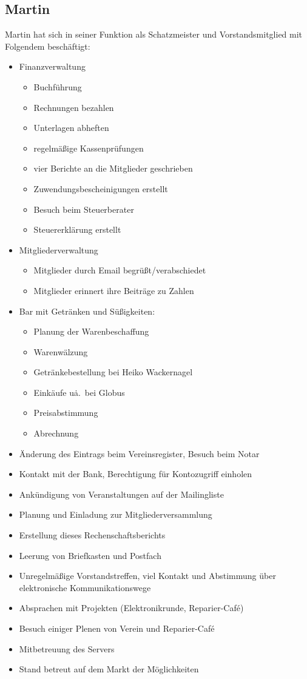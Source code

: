 \documentclass[ngerman]{scrartcl}
\begin{document}
\subsection{Martin}
Martin hat sich in seiner Funktion als Schatzmeister und Vorstandsmitglied mit Folgendem beschäftigt:
\begin{itemize}
	\item Finanzverwaltung
	\begin{itemize}
		\item Buchführung
		\item Rechnungen bezahlen
		\item Unterlagen abheften
		\item regelmäßige Kassenprüfungen
		\item vier Berichte an die Mitglieder geschrieben
		\item Zuwendungsbescheinigungen erstellt
		\item Besuch beim Steuerberater
		\item Steuererklärung erstellt
	\end{itemize}
	\item Mitgliederverwaltung
	\begin{itemize}
		\item Mitglieder durch Email begrüßt/verabschiedet
		\item Mitglieder erinnert ihre Beiträge zu Zahlen
	\end{itemize}
	\item Bar mit Getränken und Süßigkeiten:
	\begin{itemize}
		\item Planung der Warenbeschaffung
		\item Warenwälzung
		\item Getränkebestellung bei Heiko Wackernagel
		\item Einkäufe u\.a.\ bei Globus
		\item Preisabstimmung
		\item Abrechnung
	\end{itemize}
	\item Änderung des Eintrags beim Vereinsregister, Besuch beim Notar
	\item Kontakt mit der Bank, Berechtigung für Kontozugriff einholen
	\item Ankündigung von Veranstaltungen auf der Mailingliste
	\item Planung und Einladung zur Mitgliederversammlung
	\item Erstellung dieses Rechenschaftsberichts
	\item Leerung von Briefkasten und Postfach
	\item Unregelmäßige Vorstandstreffen, viel Kontakt und Abstimmung über elektronische Kommunikationswege
	\item Absprachen mit Projekten (Elektronikrunde, Reparier-Café)
	\item Besuch einiger Plenen von Verein und Reparier-Café
	\item Mitbetreuung des Servers
	\item Stand betreut auf dem Markt der Möglichkeiten
\end{itemize}
\end{document}

